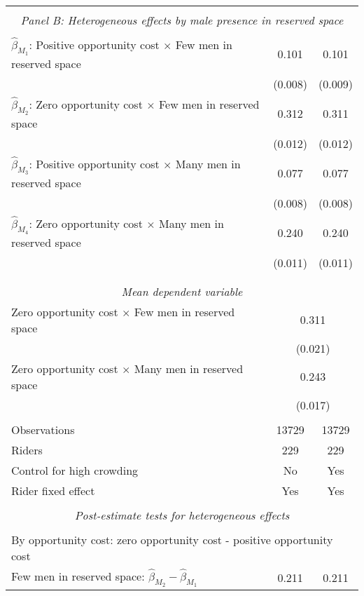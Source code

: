 \begin{tabular}{l*{2}{c}}
\hline \\[-1ex] \multicolumn{3}{c}{\textit{Panel B: Heterogeneous effects by male presence in reserved space}} \\\\[-1ex]
$\hat\beta_{M_1}$: Positive opportunity cost $\times$ Few men in reserved space&       0.101\sym{***}&       0.101\sym{***}\\
                    &     (0.008)         &     (0.009)         \\
[1em]
$\hat\beta_{M_2}$: Zero opportunity cost $\times$ Few men in reserved space&       0.312\sym{***}&       0.311\sym{***}\\
                    &     (0.012)         &     (0.012)         \\
[1em]
$\hat\beta_{M_3}$: Positive opportunity cost $\times$ Many men in reserved space&       0.077\sym{***}&       0.077\sym{***}\\
                    &     (0.008)         &     (0.008)         \\
[1em]
$\hat\beta_{M_4}$: Zero opportunity cost $\times$ Many men in reserved space&       0.240\sym{***}&       0.240\sym{***}\\
                    &     (0.011)         &     (0.011)         \\
\\[-1.8ex] \hline \\[-1.8ex] \multicolumn{3}{c}{\textit{Mean dependent variable}} \\ Zero opportunity cost $\times$ Few men in reserved space & \multicolumn{2}{c}{0.311} \\ & \multicolumn{2}{c}{(0.021)} \\ Zero opportunity cost $\times$ Many men in reserved space & \multicolumn{2}{c}{0.243} \\ & \multicolumn{2}{c}{(0.017)} \\\\[-1ex] 
Observations        &       13729         &       13729         \\
Riders              &         229         &         229         \\
Control for high crowding&          No         &         Yes         \\
Rider fixed effect  &         Yes         &         Yes         \\
\hline \\[-1ex]  \multicolumn{3}{c}{\textit{Post-estimate tests for heterogeneous effects}} \\\\[-1ex] \multicolumn{3}{l}{By opportunity cost: zero opportunity cost - positive opportunity cost} \\ \quad Few men in reserved space: $\hat\beta_{M_2} - \hat\beta_{M_1}$&       0.211         &       0.211         \\

\end{tabular}

